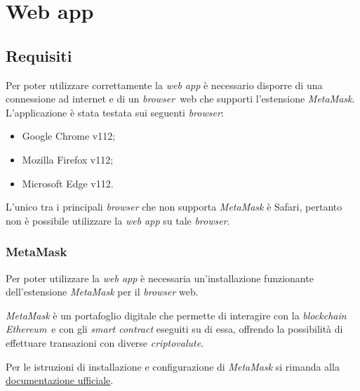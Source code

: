\section{Web app}

\subsection{Requisiti}
Per poter utilizzare correttamente la \textit{web app} è necessario disporre di una connessione ad internet e di un \textit{browser}\glo\ web che supporti l'estensione \textit{MetaMask}. L'applicazione è stata testata sui seguenti \textit{browser}:
\begin{itemize}
    \item Google Chrome v112;
    \item Mozilla Firefox v112;
    \item Microsoft Edge v112.
\end{itemize}
L'unico tra i principali \textit{browser} che non supporta \textit{MetaMask} è Safari, pertanto non è possibile utilizzare la \textit{web app} su tale \textit{browser}.

\subsubsection{MetaMask}
Per poter utilizzare la \textit{web app} è necessaria un'installazione funzionante dell'estensione \textit{MetaMask} per il \textit{browser} web.

\textit{MetaMask} è un portafoglio digitale che permette di interagire con la \textit{blockchain} \textit{Ethereum}\glo\ e con gli \textit{smart contract} eseguiti su di essa, offrendo la possibilità di effettuare transazioni con diverse \textit{criptovalute}\glo.

Per le istruzioni di installazione e configurazione di \textit{MetaMask} si rimanda alla \href{https://support.metamask.io/hc/en-us/articles/360015489531-Getting-started-with-MetaMask}{documentazione ufficiale}.
\pagebreak

